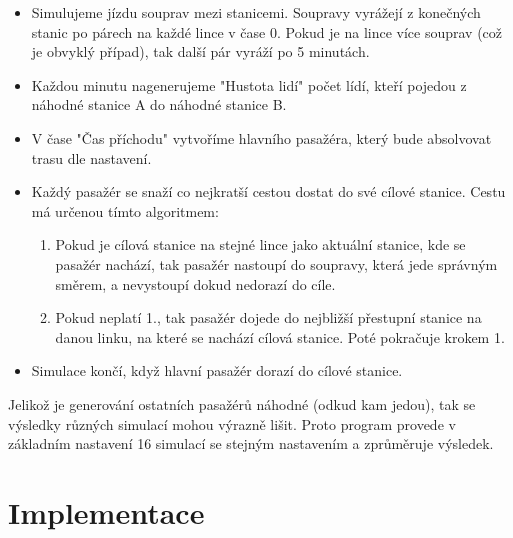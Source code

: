 \documentclass[12pt, a4paper]{article}
\begin{document}
\begin{itemize}
    \item Simulujeme jízdu souprav mezi stanicemi. Soupravy vyrážejí z konečných stanic po párech na každé lince v čase 0. Pokud je na lince více souprav (což je obvyklý případ), tak další pár vyráží po 5 minutách.
    \item Každou minutu nagenerujeme "Hustota lidí" počet lídí, kteří pojedou z náhodné stanice A do náhodné stanice B.
    \item V čase "Čas příchodu" vytvoříme hlavního pasažéra, který bude absolvovat trasu dle nastavení.
    \item Každý pasažér se snaží co nejkratší cestou dostat do své cílové stanice. Cestu má určenou tímto algoritmem:
        \begin{enumerate}
            \item Pokud je cílová stanice na stejné lince jako aktuální stanice, kde se pasažér nachází, tak pasažér nastoupí do soupravy, která jede správným směrem, a nevystoupí dokud nedorazí do cíle.
            \item Pokud neplatí 1., tak pasažér dojede do nejbližší přestupní stanice na danou linku, na které se nachází cílová stanice. Poté pokračuje krokem 1.
        \end{enumerate} 
    \item Simulace končí, když hlavní pasažér dorazí do cílové stanice.
\end{itemize}

Jelikož je generování ostatních pasažérů náhodné (odkud kam jedou), tak se výsledky různých simulací mohou výrazně lišit. Proto program provede v základním nastavení 16 simulací se stejným nastavením a zprůměruje výsledek.

\section{Implementace}
\end{document}
